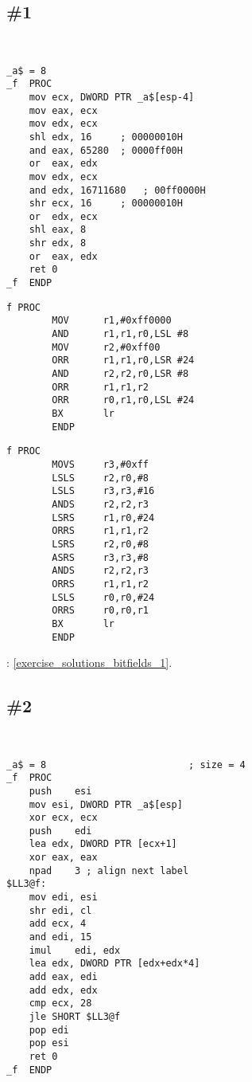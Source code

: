 \section{\Exercises}

\subsection{\Exercise \#1}
\label{exercise_bitfields_1}

\WhatThisCodeDoes\

\begin{lstlisting}[caption=\Optimizing MSVC 2010]
_a$ = 8
_f	PROC
	mov	ecx, DWORD PTR _a$[esp-4]
	mov	eax, ecx
	mov	edx, ecx
	shl	edx, 16		; 00000010H
	and	eax, 65280	; 0000ff00H
	or	eax, edx
	mov	edx, ecx
	and	edx, 16711680	; 00ff0000H
	shr	ecx, 16		; 00000010H
	or	edx, ecx
	shl	eax, 8
	shr	edx, 8
	or	eax, edx
	ret	0
_f	ENDP
\end{lstlisting}

\begin{lstlisting}[caption=\OptimizingKeilVI (\ARMMode)]
f PROC
        MOV      r1,#0xff0000
        AND      r1,r1,r0,LSL #8
        MOV      r2,#0xff00
        ORR      r1,r1,r0,LSR #24
        AND      r2,r2,r0,LSR #8
        ORR      r1,r1,r2
        ORR      r0,r1,r0,LSL #24
        BX       lr
        ENDP
\end{lstlisting}

\begin{lstlisting}[caption=\OptimizingKeilVI (\ThumbMode)]
f PROC
        MOVS     r3,#0xff
        LSLS     r2,r0,#8
        LSLS     r3,r3,#16
        ANDS     r2,r2,r3
        LSRS     r1,r0,#24
        ORRS     r1,r1,r2
        LSRS     r2,r0,#8
        ASRS     r3,r3,#8
        ANDS     r2,r2,r3
        ORRS     r1,r1,r2
        LSLS     r0,r0,#24
        ORRS     r0,r0,r1
        BX       lr
        ENDP
\end{lstlisting}

\Answer{}: \ref{exercise_solutions_bitfields_1}.

\subsection{\Exercise \#2}
\label{exercise_bitfields_2}

\WhatThisCodeDoes\

\begin{lstlisting}[caption=\Optimizing MSVC 2010]
_a$ = 8							; size = 4
_f	PROC
	push	esi
	mov	esi, DWORD PTR _a$[esp]
	xor	ecx, ecx
	push	edi
	lea	edx, DWORD PTR [ecx+1]
	xor	eax, eax
	npad	3 ; align next label
$LL3@f:
	mov	edi, esi
	shr	edi, cl
	add	ecx, 4
	and	edi, 15
	imul	edi, edx
	lea	edx, DWORD PTR [edx+edx*4]
	add	eax, edi
	add	edx, edx
	cmp	ecx, 28
	jle	SHORT $LL3@f
	pop	edi
	pop	esi
	ret	0
_f	ENDP
\end{lstlisting}

